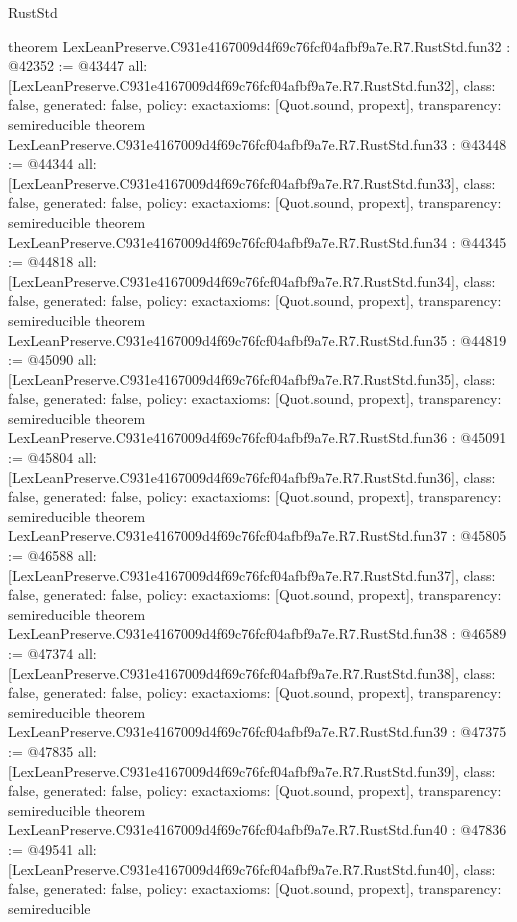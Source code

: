 \begin{lexlean}{RustStd}
\begin{coremodule}
{}
theorem LexLeanPreserve.C931e4167009d4f69c76fcf04afbf9a7e.R7.RustStd.fun32 : @42352 := @43447 {
  all: [LexLeanPreserve.C931e4167009d4f69c76fcf04afbf9a7e.R7.RustStd.fun32],
  class: false,
  generated: false,
  policy: exact{axioms: [Quot.sound, propext]},
  transparency: semireducible
}
theorem LexLeanPreserve.C931e4167009d4f69c76fcf04afbf9a7e.R7.RustStd.fun33 : @43448 := @44344 {
  all: [LexLeanPreserve.C931e4167009d4f69c76fcf04afbf9a7e.R7.RustStd.fun33],
  class: false,
  generated: false,
  policy: exact{axioms: [Quot.sound, propext]},
  transparency: semireducible
}
theorem LexLeanPreserve.C931e4167009d4f69c76fcf04afbf9a7e.R7.RustStd.fun34 : @44345 := @44818 {
  all: [LexLeanPreserve.C931e4167009d4f69c76fcf04afbf9a7e.R7.RustStd.fun34],
  class: false,
  generated: false,
  policy: exact{axioms: [Quot.sound, propext]},
  transparency: semireducible
}
theorem LexLeanPreserve.C931e4167009d4f69c76fcf04afbf9a7e.R7.RustStd.fun35 : @44819 := @45090 {
  all: [LexLeanPreserve.C931e4167009d4f69c76fcf04afbf9a7e.R7.RustStd.fun35],
  class: false,
  generated: false,
  policy: exact{axioms: [Quot.sound, propext]},
  transparency: semireducible
}
theorem LexLeanPreserve.C931e4167009d4f69c76fcf04afbf9a7e.R7.RustStd.fun36 : @45091 := @45804 {
  all: [LexLeanPreserve.C931e4167009d4f69c76fcf04afbf9a7e.R7.RustStd.fun36],
  class: false,
  generated: false,
  policy: exact{axioms: [Quot.sound, propext]},
  transparency: semireducible
}
theorem LexLeanPreserve.C931e4167009d4f69c76fcf04afbf9a7e.R7.RustStd.fun37 : @45805 := @46588 {
  all: [LexLeanPreserve.C931e4167009d4f69c76fcf04afbf9a7e.R7.RustStd.fun37],
  class: false,
  generated: false,
  policy: exact{axioms: [Quot.sound, propext]},
  transparency: semireducible
}
theorem LexLeanPreserve.C931e4167009d4f69c76fcf04afbf9a7e.R7.RustStd.fun38 : @46589 := @47374 {
  all: [LexLeanPreserve.C931e4167009d4f69c76fcf04afbf9a7e.R7.RustStd.fun38],
  class: false,
  generated: false,
  policy: exact{axioms: [Quot.sound, propext]},
  transparency: semireducible
}
theorem LexLeanPreserve.C931e4167009d4f69c76fcf04afbf9a7e.R7.RustStd.fun39 : @47375 := @47835 {
  all: [LexLeanPreserve.C931e4167009d4f69c76fcf04afbf9a7e.R7.RustStd.fun39],
  class: false,
  generated: false,
  policy: exact{axioms: [Quot.sound, propext]},
  transparency: semireducible
}
theorem LexLeanPreserve.C931e4167009d4f69c76fcf04afbf9a7e.R7.RustStd.fun40 : @47836 := @49541 {
  all: [LexLeanPreserve.C931e4167009d4f69c76fcf04afbf9a7e.R7.RustStd.fun40],
  class: false,
  generated: false,
  policy: exact{axioms: [Quot.sound, propext]},
  transparency: semireducible
}
\end{coremodule}
\end{lexlean}
